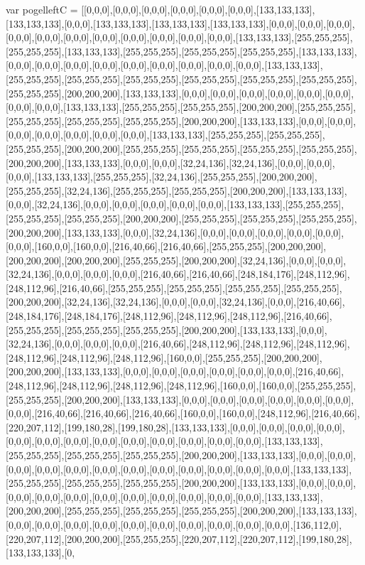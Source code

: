 var pogelleftC = [[0,0,0],[0,0,0],[0,0,0],[0,0,0],[0,0,0],[0,0,0],[133,133,133],[133,133,133],[0,0,0],[133,133,133],[133,133,133],[133,133,133],[0,0,0],[0,0,0],[0,0,0],[0,0,0],[0,0,0],[0,0,0],[0,0,0],[0,0,0],[0,0,0],[0,0,0],[0,0,0],[133,133,133],[255,255,255],[255,255,255],[133,133,133],[255,255,255],[255,255,255],[255,255,255],[133,133,133],[0,0,0],[0,0,0],[0,0,0],[0,0,0],[0,0,0],[0,0,0],[0,0,0],[0,0,0],[0,0,0],[133,133,133],[255,255,255],[255,255,255],[255,255,255],[255,255,255],[255,255,255],[255,255,255],[255,255,255],[200,200,200],[133,133,133],[0,0,0],[0,0,0],[0,0,0],[0,0,0],[0,0,0],[0,0,0],[0,0,0],[0,0,0],[133,133,133],[255,255,255],[255,255,255],[200,200,200],[255,255,255],[255,255,255],[255,255,255],[255,255,255],[200,200,200],[133,133,133],[0,0,0],[0,0,0],[0,0,0],[0,0,0],[0,0,0],[0,0,0],[0,0,0],[133,133,133],[255,255,255],[255,255,255],[255,255,255],[200,200,200],[255,255,255],[255,255,255],[255,255,255],[255,255,255],[200,200,200],[133,133,133],[0,0,0],[0,0,0],[32,24,136],[32,24,136],[0,0,0],[0,0,0],[0,0,0],[133,133,133],[255,255,255],[32,24,136],[255,255,255],[200,200,200],[255,255,255],[32,24,136],[255,255,255],[255,255,255],[200,200,200],[133,133,133],[0,0,0],[32,24,136],[0,0,0],[0,0,0],[0,0,0],[0,0,0],[0,0,0],[133,133,133],[255,255,255],[255,255,255],[255,255,255],[200,200,200],[255,255,255],[255,255,255],[255,255,255],[200,200,200],[133,133,133],[0,0,0],[32,24,136],[0,0,0],[0,0,0],[0,0,0],[0,0,0],[0,0,0],[0,0,0],[160,0,0],[160,0,0],[216,40,66],[216,40,66],[255,255,255],[200,200,200],[200,200,200],[200,200,200],[255,255,255],[200,200,200],[32,24,136],[0,0,0],[0,0,0],[32,24,136],[0,0,0],[0,0,0],[0,0,0],[216,40,66],[216,40,66],[248,184,176],[248,112,96],[248,112,96],[216,40,66],[255,255,255],[255,255,255],[255,255,255],[255,255,255],[200,200,200],[32,24,136],[32,24,136],[0,0,0],[0,0,0],[32,24,136],[0,0,0],[216,40,66],[248,184,176],[248,184,176],[248,112,96],[248,112,96],[248,112,96],[216,40,66],[255,255,255],[255,255,255],[255,255,255],[200,200,200],[133,133,133],[0,0,0],[32,24,136],[0,0,0],[0,0,0],[0,0,0],[216,40,66],[248,112,96],[248,112,96],[248,112,96],[248,112,96],[248,112,96],[248,112,96],[160,0,0],[255,255,255],[200,200,200],[200,200,200],[133,133,133],[0,0,0],[0,0,0],[0,0,0],[0,0,0],[0,0,0],[0,0,0],[216,40,66],[248,112,96],[248,112,96],[248,112,96],[248,112,96],[160,0,0],[160,0,0],[255,255,255],[255,255,255],[200,200,200],[133,133,133],[0,0,0],[0,0,0],[0,0,0],[0,0,0],[0,0,0],[0,0,0],[0,0,0],[216,40,66],[216,40,66],[216,40,66],[160,0,0],[160,0,0],[248,112,96],[216,40,66],[220,207,112],[199,180,28],[199,180,28],[133,133,133],[0,0,0],[0,0,0],[0,0,0],[0,0,0],[0,0,0],[0,0,0],[0,0,0],[0,0,0],[0,0,0],[0,0,0],[0,0,0],[0,0,0],[0,0,0],[133,133,133],[255,255,255],[255,255,255],[255,255,255],[200,200,200],[133,133,133],[0,0,0],[0,0,0],[0,0,0],[0,0,0],[0,0,0],[0,0,0],[0,0,0],[0,0,0],[0,0,0],[0,0,0],[0,0,0],[0,0,0],[133,133,133],[255,255,255],[255,255,255],[255,255,255],[200,200,200],[133,133,133],[0,0,0],[0,0,0],[0,0,0],[0,0,0],[0,0,0],[0,0,0],[0,0,0],[0,0,0],[0,0,0],[0,0,0],[0,0,0],[133,133,133],[200,200,200],[255,255,255],[255,255,255],[255,255,255],[200,200,200],[133,133,133],[0,0,0],[0,0,0],[0,0,0],[0,0,0],[0,0,0],[0,0,0],[0,0,0],[0,0,0],[0,0,0],[0,0,0],[136,112,0],[220,207,112],[200,200,200],[255,255,255],[220,207,112],[220,207,112],[199,180,28],[133,133,133],[0,